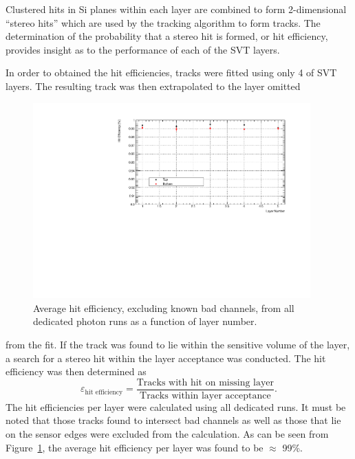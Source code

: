 
%
%
 
Clustered hits in Si planes within each layer are combined to form
2-dimensional ``stereo hits'' which are used by the tracking algorithm to 
form tracks.  The determination of the probability that a stereo hit is 
formed, or hit efficiency, provides insight as to the performance of each of 
the SVT layers.

In order to obtained the hit efficiencies, tracks were fitted using only 4 of 
SVT layers. The resulting track was then extrapolated to the layer omitted
\begin{figure}[ht]
    	\includegraphics[width=0.95\textwidth]{test2012/svtperformance/trk_performance/hit_efficiency_vs_layer.pdf}
        \caption{{\small
                    Average hit efficiency, excluding known bad channels, 
                    from all dedicated photon runs as a function of layer
                    number.  
                }} 
	\label{fig:hit_track_efficiency}
\end{figure}
from the fit. If the track was found to lie within the sensitive volume
of the layer, a search for a stereo hit within the layer acceptance was 
conducted.  The hit efficiency was then determined as
\[
    \varepsilon_{\mbox{hit efficiency}} = \frac{\mbox{Tracks with hit on missing layer}}
                                            {\mbox{Tracks within layer acceptance}}.
\]
The hit efficiencies per layer were calculated using all dedicated runs. It must 
be noted that those tracks found to intersect bad channels as well as those that 
lie on the sensor edges were excluded from the calculation. As 
can be seen from Figure~\ref{fig:hit_track_efficiency}, the average hit efficiency
per layer was found to be $\approx$ 99\%. 


